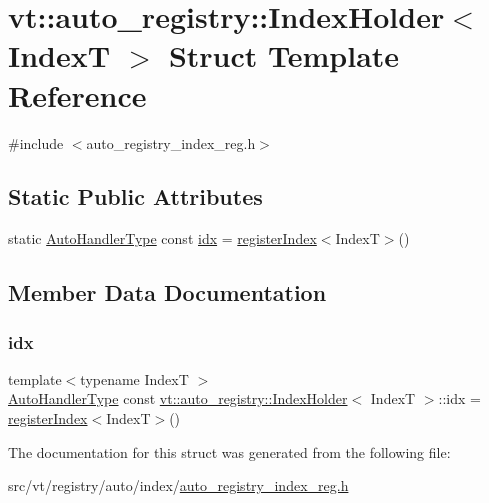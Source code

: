 \hypertarget{structvt_1_1auto__registry_1_1_index_holder}{}\section{vt\+:\+:auto\+\_\+registry\+:\+:Index\+Holder$<$ IndexT $>$ Struct Template Reference}
\label{structvt_1_1auto__registry_1_1_index_holder}


{\ttfamily \#include $<$auto\+\_\+registry\+\_\+index\+\_\+reg.\+h$>$}

\subsection*{Static Public Attributes}
\begin{DoxyCompactItemize}
\item 
static \hyperlink{namespacevt_1_1auto__registry_ae295e18699146815bb7d7674594d95d7}{Auto\+Handler\+Type} const \hyperlink{structvt_1_1auto__registry_1_1_index_holder_acf4cf7883708e88e7174b5380b1892f8}{idx} = \hyperlink{namespacevt_1_1auto__registry_a234dcadb35d20ff9a4d0e2464680aa36}{register\+Index}$<$IndexT$>$()
\end{DoxyCompactItemize}


\subsection{Member Data Documentation}
\mbox{\label{structvt_1_1auto__registry_1_1_index_holder_acf4cf7883708e88e7174b5380b1892f8}} 
\subsubsection{\texorpdfstring{idx}{idx}}
{\footnotesize\ttfamily template$<$typename IndexT $>$ \\
\hyperlink{namespacevt_1_1auto__registry_ae295e18699146815bb7d7674594d95d7}{Auto\+Handler\+Type} const \hyperlink{structvt_1_1auto__registry_1_1_index_holder}{vt\+::auto\+\_\+registry\+::\+Index\+Holder}$<$ IndexT $>$\+::idx = \hyperlink{namespacevt_1_1auto__registry_a234dcadb35d20ff9a4d0e2464680aa36}{register\+Index}$<$IndexT$>$()\hspace{0.3cm}{\ttfamily [static]}}



The documentation for this struct was generated from the following file\+:\begin{DoxyCompactItemize}
\item 
src/vt/registry/auto/index/\hyperlink{auto__registry__index__reg_8h}{auto\+\_\+registry\+\_\+index\+\_\+reg.\+h}\end{DoxyCompactItemize}
